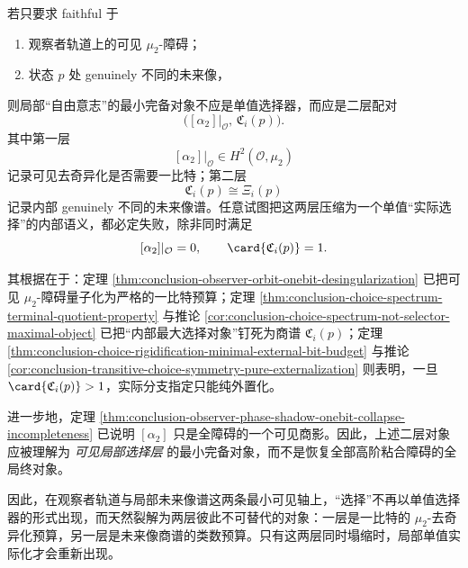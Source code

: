 \begin{conjecture}[局部自由意志的最小完备对象是可见障碍位与选择谱的二层配对]\label{conj:conclusion-local-freewill-minimal-object-visible-choice-pair}
若只要求 faithful 于
\begin{enumerate}
  \item 观察者轨道上的可见 \(\mu_2\)-障碍；
  \item 状态 \(p\) 处 genuinely 不同的未来像，
\end{enumerate}
则局部“自由意志”的最小完备对象不应是单值选择器，而应是二层配对
\[
\bigl([\alpha_2]|_{\mathcal O},\,\mathfrak C_i(p)\bigr).
\]
其中第一层
\[
[\alpha_2]|_{\mathcal O}\in H^2(\mathcal O,\mu_2)
\]
记录可见去奇异化是否需要一比特；第二层
\[
\mathfrak C_i(p)\cong \Xi_i(p)
\]
记录内部 genuinely 不同的未来像谱。任意试图把这两层压缩为一个单值“实际选择”的内部语义，都必定失败，除非同时满足
\[
[\alpha_2]|_{\mathcal O}=0,
\qquad
\card{\mathfrak C_i(p)}=1.
\]

其根据在于：定理 \ref{thm:conclusion-observer-orbit-onebit-desingularization} 已把可见 \(\mu_2\)-障碍量子化为严格的一比特预算；定理 \ref{thm:conclusion-choice-spectrum-terminal-quotient-property} 与推论 \ref{cor:conclusion-choice-spectrum-not-selector-maximal-object} 已把“内部最大选择对象”钉死为商谱 \(\mathfrak C_i(p)\)；定理 \ref{thm:conclusion-choice-rigidification-minimal-external-bit-budget} 与推论 \ref{cor:conclusion-transitive-choice-symmetry-pure-externalization} 则表明，一旦 \(\card{\mathfrak C_i(p)}>1\)，实际分支指定只能纯外置化。

进一步地，定理 \ref{thm:conclusion-observer-phase-shadow-onebit-collapse-incompleteness} 已说明 \([\alpha_2]\) 只是全障碍的一个可见商影。因此，上述二层对象应被理解为 \emph{可见局部选择层} 的最小完备对象，而不是恢复全部高阶粘合障碍的全局终对象。
\end{conjecture}

\noindent
因此，在观察者轨道与局部未来像谱这两条最小可见轴上，“选择”不再以单值选择器的形式出现，而天然裂解为两层彼此不可替代的对象：一层是一比特的 \(\mu_2\)-去奇异化预算，另一层是未来像商谱的类数预算。只有这两层同时塌缩时，局部单值实际化才会重新出现。









